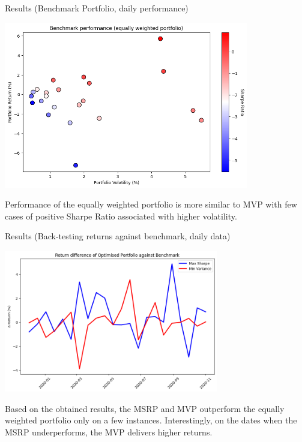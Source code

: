 \documentclass{beamer}
\begin{document}
\begin{frame}{Results (Benchmark Portfolio, daily performance)}
    \begin{center}
        \includegraphics[width=0.8\textwidth]{Graphics/Benchmark performance (equally weighted portfolio).png}
    \end{center}
Performance of the equally weighted portfolio is more similar to MVP with few cases of positive Sharpe Ratio associated with higher volatility.  
\end{frame}

\begin{frame}{Results (Back-testing returns against benchmark, daily data)}
    \begin{center}
        \includegraphics[width=0.7\textwidth]{Graphics/Return difference of Optimised Portfolio against Benchmark.png}
    \end{center}

\small {Based on the obtained results, the MSRP and MVP outperform the equally weighted portfolio only on a few instances. Interestingly, on the dates when the MSRP underperforms, the MVP delivers higher returns. }

\end{frame}
\end{document}
